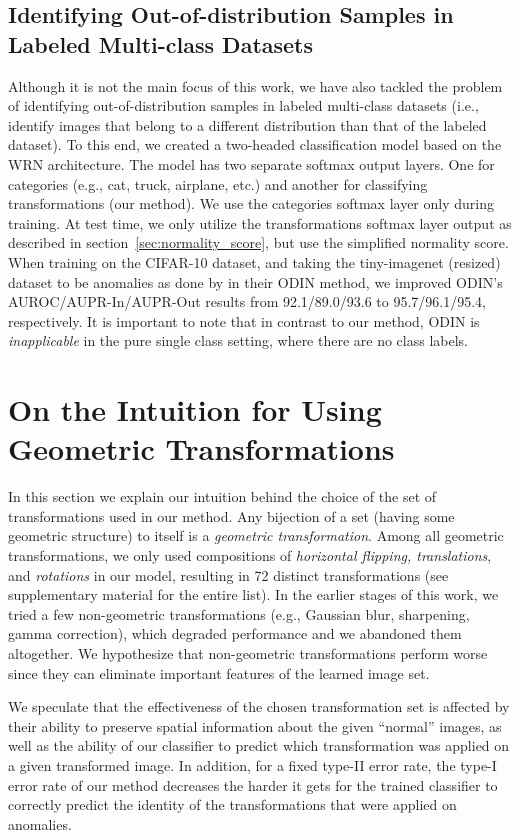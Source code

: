 \documentclass{article}
\begin{document}
	\subsection{Identifying Out-of-distribution Samples in Labeled Multi-class Datasets}
	\label{sec:multiclass_ood}
    Although it is not the main focus of this work, we have also tackled the problem of identifying out-of-distribution samples in labeled multi-class datasets (i.e., identify images that belong to a different distribution than that of the labeled dataset). 
    To this end, we created a two-headed classification model based on the WRN architecture. 
    The model has two separate softmax output layers. One for categories (e.g., cat, truck, airplane, etc.) and another for classifying transformations (our method). We use the categories softmax layer only during training.
    At test time, we only utilize the transformations softmax layer output as described in section~\ref{sec:normality_score}, but use the simplified normality score.
    When training on the CIFAR-10 dataset, and taking the tiny-imagenet (resized) dataset to be anomalies as done by \citet{liang2018enhancing} in their ODIN method, we improved ODIN's AUROC/AUPR-In/AUPR-Out results from 92.1/89.0/93.6 to 95.7/96.1/95.4, respectively. It is important to note that in contrast to our method, ODIN is {\em inapplicable} in the pure single class setting, where there are no class labels.
	
	\section{On the Intuition for Using Geometric Transformations}
	\label{sec:intuition}
	In this section we explain our intuition behind the choice of the set of transformations used in our method. Any bijection of a set (having some geometric structure) to itself is a \emph{geometric transformation}. Among all geometric transformations, we only used compositions of {\em horizontal flipping, translations}, and {\em rotations} in our model, resulting in 72 distinct transformations (see supplementary material for the entire list). In the earlier stages of this work, we tried a few non-geometric transformations (e.g., Gaussian blur, sharpening, gamma correction), which degraded performance and we abandoned them altogether.
	We hypothesize that non-geometric transformations perform worse since they can eliminate important features of the learned image set.
	
	We speculate that the effectiveness of the chosen transformation set is affected by their ability to preserve spatial information about the given ``normal'' images, as well as the ability of our classifier to predict which transformation was applied on a given transformed image.
	In addition, for a fixed type-II error rate, the type-I error rate of our method decreases the harder it gets for the trained classifier to correctly predict the identity of the transformations that were applied on anomalies.
	
\end{document}
